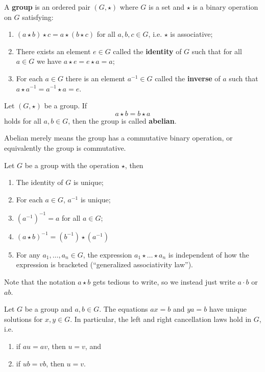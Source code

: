 \begin{defn}
A \textbf{group} is an ordered pair $(G,\star)$ where $G$ is a set and $\star$ 
is a binary operation on $G$ satisfying:
\begin{enumerate}
\item $(a\star b)\star c = a\star(b\star c)$ for all $a,b,c\in G$, i.e. $\star$ is
associative;
\item There exists an element $e\in G$ called the \textbf{identity} of $G$ such
that for all $a\in G$ we have $a\star e = e\star a = a$;
\item For each $a\in G$ there is an element $a^{-1}\in G$ called the \textbf{inverse} of $a$ such that $a\star a^{-1} = a^{-1}\star a = e$.
\end{enumerate}
\end{defn}

\begin{defn}
Let $(G,\star)$ be a group. If 
\begin{equation}
a\star b = b\star a
\end{equation}
holds for all $a,b\in G$, then the group is called \textbf{abelian}.
\end{defn}

\begin{rmk}
Abelian merely means the group has a commutative binary operation, or equivalently
the group is commutative.
\end{rmk}

\begin{thm}
Let $G$ be a group with the operation $\star$, then
\begin{enumerate}
\item The identity of $G$ is unique;
\item For each $a\in G$, $a^{-1}$ is unique;
\item $(a^{-1})^{-1}=a$ for all $a\in G$;
\item $(a\star b)^{-1}=(b^{-1})\star(a^{-1})$
\item For any $a_1,\ldots,a_n\in G$, the expression $a_1\star\ldots\star a_n$ is
independent of how the expression is bracketed (``generalized associativity law'').
\end{enumerate}
\end{thm}

Note that the notation $a\star b$ gets tedious to write, so we instead just
write $a\cdot b$ or $ab$. 

\begin{thm}
Let $G$ be a group and $a,b\in G$. The equations $ax = b$ and $ya = b$ have
unique solutions for $x,y\in G$. In particular, the left and right cancellation
laws hold in $G$, i.e.
\begin{enumerate}
\item if $au = av$, then $u=v$, and
\item if $ub = vb$, then $u=v$.
\end{enumerate}
\end{thm}

